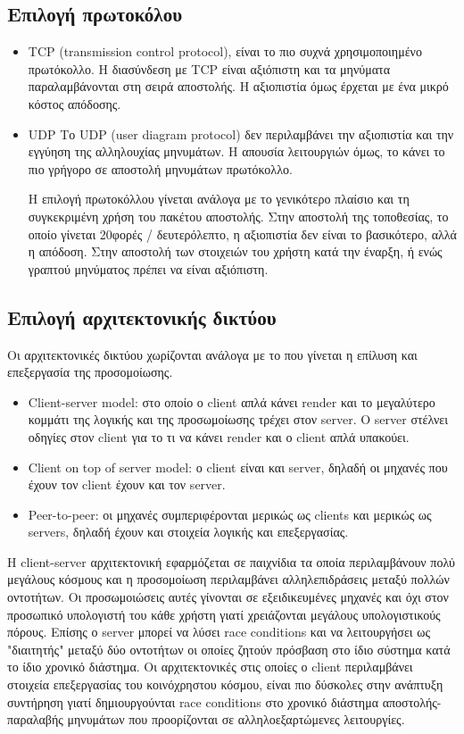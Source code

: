 		\subsection{Επιλογή πρωτοκόλου}
		\begin{itemize}	
			\item TCP (transmission control protocol), είναι το πιο συχνά χρησιμοποιημένο πρωτόκολλο. Η διασύνδεση με TCP είναι αξιόπιστη και τα μηνύματα παραλαμβάνονται στη σειρά αποστολής. Η αξιοπιστία όμως έρχεται με ένα μικρό κόστος απόδοσης.
			\item UDP Το UDP (user diagram protocol) δεν περιλαμβάνει την αξιοπιστία και την εγγύηση της αλληλουχίας μηνυμάτων. Η απουσία λειτουργιών όμως, το κάνει το πιο γρήγορο σε αποστολή μηνυμάτων πρωτόκολλο.
			
			Η επιλογή πρωτοκόλλου γίνεται ανάλογα με το γενικότερο πλαίσιο και τη συγκεκριμένη χρήση του πακέτου αποστολής. Στην αποστολή της τοποθεσίας, το οποίο γίνεται 20φορές / δευτερόλεπτο, η αξιοπιστία δεν είναι το βασικότερο, αλλά η απόδοση. Στην αποστολή των στοιχειών του χρήστη κατά την έναρξη, ή ενώς γραπτού μηνύματος πρέπει να είναι αξιόπιστη.
		\end{itemize}

		\subsection{Επιλογή αρχιτεκτονικής δικτύου}
			Οι αρχιτεκτονικές δικτύου χωρίζονται ανάλογα με το που γίνεται η επίλυση και επεξεργασία της προσομοίωσης.  
		\begin{itemize}	
			\item Client-server model: στο οποίο ο client απλά κάνει render και το μεγαλύτερο κομμάτι της λογικής και της προσωμοίωσης τρέχει στον server. Ο server στέλνει οδηγίες στον client για το τι να κάνει render και ο client απλά υπακούει.
			\item Client on top of server model: ο client είναι και server, δηλαδή οι μηχανές που έχουν τον client έχουν και τον server.
			\item Peer-to-peer: οι μηχανές συμπεριφέρονται μερικώς ως clients και μερικώς ως servers, δηλαδή έχουν και στοιχεία λογικής και επεξεργασίας.
		\end{itemize}
			Η client-server αρχιτεκτονική εφαρμόζεται σε παιχνίδια τα οποία περιλαμβάνουν πολύ μεγάλους κόσμους και η προσομοίωση περιλαμβάνει αλληλεπιδράσεις μεταξύ πολλών οντοτήτων. Οι προσωμοιώσεις αυτές γίνονται σε εξειδικευμένες μηχανές και όχι στον προσωπικό υπολογιστή του κάθε χρήστη γιατί χρειάζονται μεγάλους υπολογιστικούς πόρους. Επίσης ο server μπορεί να λύσει race conditions και να λειτουργήσει ως "διαιτητής" μεταξύ δύο οντοτήτων οι οποίες ζητούν πρόσβαση στο ίδιο σύστημα κατά το ίδιο χρονικό διάστημα. Οι αρχιτεκτονικές στις οποίες ο client περιλαμβάνει στοιχεία επεξεργασίας του κοινόχρηστου κόσμου, είναι πιο δύσκολες στην ανάπτυξη συντήρηση γιατί δημιουργούνται race conditions στο χρονικό διάστημα αποστολής-παραλαβής μηνυμάτων που προορίζονται σε αλληλοεξαρτώμενες λειτουργίες.
			
